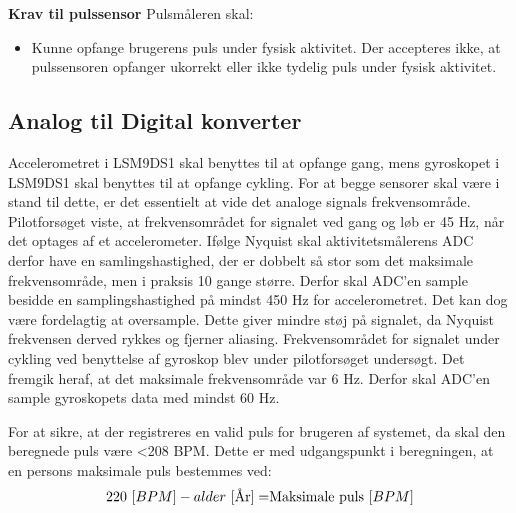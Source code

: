 \textbf{Krav til pulssensor} \newline
Pulsmåleren skal:
\begin{itemize}
\item Kunne opfange brugerens puls under fysisk aktivitet. Der accepteres ikke, at pulssensoren opfanger ukorrekt eller ikke tydelig puls under fysisk aktivitet.
\end{itemize}

\subsection{Analog til Digital konverter} \label{krav_adc}
Accelerometret i LSM9DS1 skal benyttes til at opfange gang, mens gyroskopet i LSM9DS1 skal benyttes til at opfange cykling. For at begge sensorer skal være i stand til dette, er det essentielt at vide det analoge signals frekvensområde. %
Pilotforsøget viste, at frekvensområdet for signalet ved gang og løb er 45 Hz, når det optages af et accelerometer. Ifølge Nyquist skal aktivitetsmålerens ADC derfor have en samlingshastighed, der er dobbelt så stor som det maksimale frekvensområde, men i praksis 10 gange større. Derfor skal ADC'en sample besidde en samplingshastighed på mindst 450 Hz for accelerometret. Det kan dog være fordelagtig at oversample. Dette giver mindre støj på signalet, da Nyquist frekvensen derved rykkes og fjerner aliasing. \newline
Frekvensområdet for signalet under cykling ved benyttelse af gyroskop blev under pilotforsøget undersøgt. Det fremgik heraf, at det maksimale frekvensområde var 6 Hz. Derfor skal ADC'en sample gyroskopets data med mindst 60 Hz.

For at sikre, at der registreres en valid puls for brugeren af systemet, da skal den beregnede puls være <208 BPM. Dette er med udgangspunkt i beregningen, at en persons maksimale puls bestemmes ved: \citep{CooperBlair2005} 
\begin{equation}
220~[BPM] - alder~[$År$] = $Maksimale puls$~[BPM]
\end{equation}

